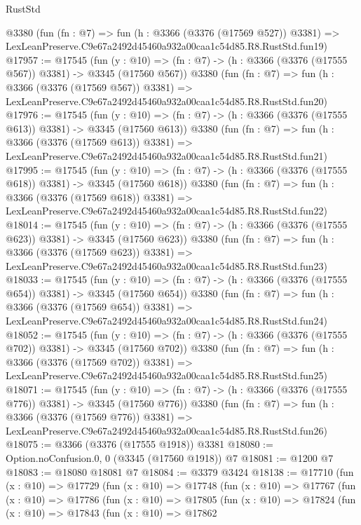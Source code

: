 \begin{lexlean}{RustStd}
\begin{coremodule}
    @3380
    (fun (fn : @7) =>
    fun (h : @3366 (@3376 (@17569 @527)) @3381) =>
    LexLeanPreserve.C9e67a2492d45460a932a00caa1c54d85.R8.RustStd.fun19)
@17957 := @17545
    (fun (y : @10) => (fn : @7) -> (h : @3366 (@3376 (@17555 @567)) @3381) -> @3345 (@17560 @567))
    @3380
    (fun (fn : @7) =>
    fun (h : @3366 (@3376 (@17569 @567)) @3381) =>
    LexLeanPreserve.C9e67a2492d45460a932a00caa1c54d85.R8.RustStd.fun20)
@17976 := @17545
    (fun (y : @10) => (fn : @7) -> (h : @3366 (@3376 (@17555 @613)) @3381) -> @3345 (@17560 @613))
    @3380
    (fun (fn : @7) =>
    fun (h : @3366 (@3376 (@17569 @613)) @3381) =>
    LexLeanPreserve.C9e67a2492d45460a932a00caa1c54d85.R8.RustStd.fun21)
@17995 := @17545
    (fun (y : @10) => (fn : @7) -> (h : @3366 (@3376 (@17555 @618)) @3381) -> @3345 (@17560 @618))
    @3380
    (fun (fn : @7) =>
    fun (h : @3366 (@3376 (@17569 @618)) @3381) =>
    LexLeanPreserve.C9e67a2492d45460a932a00caa1c54d85.R8.RustStd.fun22)
@18014 := @17545
    (fun (y : @10) => (fn : @7) -> (h : @3366 (@3376 (@17555 @623)) @3381) -> @3345 (@17560 @623))
    @3380
    (fun (fn : @7) =>
    fun (h : @3366 (@3376 (@17569 @623)) @3381) =>
    LexLeanPreserve.C9e67a2492d45460a932a00caa1c54d85.R8.RustStd.fun23)
@18033 := @17545
    (fun (y : @10) => (fn : @7) -> (h : @3366 (@3376 (@17555 @654)) @3381) -> @3345 (@17560 @654))
    @3380
    (fun (fn : @7) =>
    fun (h : @3366 (@3376 (@17569 @654)) @3381) =>
    LexLeanPreserve.C9e67a2492d45460a932a00caa1c54d85.R8.RustStd.fun24)
@18052 := @17545
    (fun (y : @10) => (fn : @7) -> (h : @3366 (@3376 (@17555 @702)) @3381) -> @3345 (@17560 @702))
    @3380
    (fun (fn : @7) =>
    fun (h : @3366 (@3376 (@17569 @702)) @3381) =>
    LexLeanPreserve.C9e67a2492d45460a932a00caa1c54d85.R8.RustStd.fun25)
@18071 := @17545
    (fun (y : @10) => (fn : @7) -> (h : @3366 (@3376 (@17555 @776)) @3381) -> @3345 (@17560 @776))
    @3380
    (fun (fn : @7) =>
    fun (h : @3366 (@3376 (@17569 @776)) @3381) =>
    LexLeanPreserve.C9e67a2492d45460a932a00caa1c54d85.R8.RustStd.fun26)
@18075 := @3366 (@3376 (@17555 @1918)) @3381
@18080 := Option.noConfusion.{0, 0} (@3345 (@17560 @1918)) @7
@18081 := @1200 @7
@18083 := @18080 @18081 @7
@18084 := @3379 @3424
@18138 := @17710
    (fun (x : @10) =>
    @17729
      (fun (x : @10) =>
      @17748
        (fun (x : @10) =>
        @17767
          (fun (x : @10) =>
          @17786
            (fun (x : @10) =>
            @17805
              (fun (x : @10) =>
              @17824
                (fun (x : @10) =>
                @17843
                  (fun (x : @10) =>
                  @17862

\end{coremodule}
\end{lexlean}
